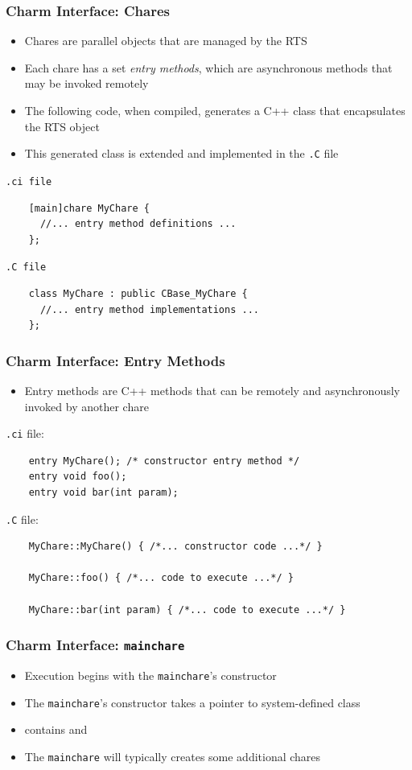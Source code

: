 \begin{frame}[fragile]
  \frametitle{Charm Interface: Chares}
  \begin{itemize}
    \item Chares are parallel objects that are managed by the RTS
    \item Each chare has a set \textit{entry methods}, which are asynchronous
      methods that may be invoked remotely
    \item The following code, when compiled, generates a C++ class
       that encapsulates the RTS object
    \item This generated class is extended and implemented in the \texttt{.C}
      file
  \end{itemize}
  \texttt{.ci file}
  \begin{lstlisting}
    [main]chare MyChare {
      //... entry method definitions ...
    };
  \end{lstlisting}
  \texttt{.C file}
  \begin{lstlisting}
    class MyChare : public CBase_MyChare {
      //... entry method implementations ...
    };
  \end{lstlisting}
\end{frame}

\begin{frame}[fragile]
  \frametitle{Charm Interface: Entry Methods}
  \begin{itemize}
  \item Entry methods are C++ methods that can be remotely and asynchronously
    invoked by another chare
  \end{itemize}
  \texttt{.ci} file:
  \begin{lstlisting}
    entry MyChare(); /* constructor entry method */
    entry void foo();
    entry void bar(int param);
  \end{lstlisting}
  \texttt{.C} file:
  \begin{lstlisting}
    MyChare::MyChare() { /*... constructor code ...*/ }

    MyChare::foo() { /*... code to execute ...*/ }

    MyChare::bar(int param) { /*... code to execute ...*/ }
  \end{lstlisting}
\end{frame}

\begin{frame}[fragile]
   \frametitle{Charm Interface: \texttt{mainchare}}
   \begin{itemize}
     \item Execution begins with the \texttt{mainchare}'s constructor
     \item The \texttt{mainchare}'s constructor takes a pointer to
       system-defined class 
     \item {} contains  and 
     \item The \texttt{mainchare} will typically creates some additional chares
   \end{itemize}
\end{frame}

